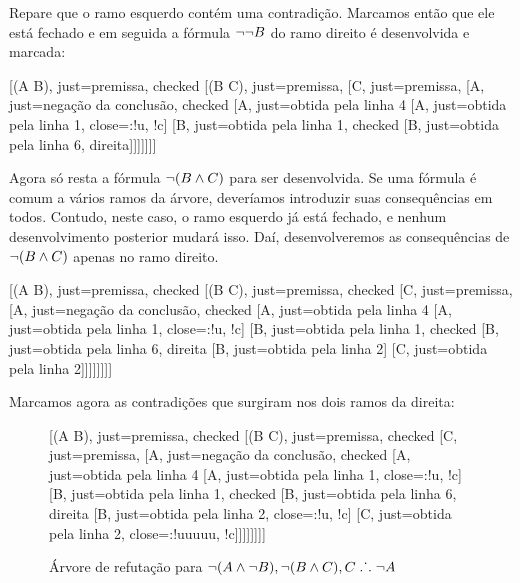 Repare que o ramo esquerdo contém uma contradição. Marcamos então que ele está fechado e em seguida a fórmula $\neg \neg B$ do ramo direito é desenvolvida e marcada:
\begin{center}
	\begin{tableau}
		{
		}
		[\enot(A \eand \enot B), just=premissa, checked
		[\enot(B \eand C), just=premissa, 
		[C, just=premissa, 
		[\enot \enot A, just={negação da conclusão}, checked
		[A, just={obtida pela linha 4}
			[\enot A, just={obtida pela linha 1}, close={:!u, !c}]
			[\enot \enot B, just={obtida pela linha 1}, checked
			[B, just={obtida pela linha 6, direita}]]]]]]]
	\end{tableau}
\end{center}

Agora só resta a fórmula $\neg(B \wedge C)$ para ser desenvolvida. 
Se uma fórmula é comum a vários ramos da árvore, deveríamos introduzir suas consequências em todos. Contudo, neste caso, o ramo esquerdo já está fechado, e nenhum desenvolvimento posterior mudará isso.
Daí, desenvolveremos as consequências de $\neg(B \wedge C)$ apenas no ramo direito.

\begin{center}
	\begin{tableau}
		{
		}
		[\enot(A \eand \enot B), just=premissa, checked
		[\enot(B \eand C), just=premissa, checked
		[C, just=premissa, 
		[\enot \enot A, just={negação da conclusão}, checked
		[A, just={obtida pela linha 4}
			[\enot A, just={obtida pela linha 1}, close={:!u, !c}]
			[\enot \enot B, just={obtida pela linha 1}, checked
			[B, just={obtida pela linha 6, direita}			
				[\enot B, just={obtida pela linha 2}]
				[\enot C, just={obtida pela linha 2}]]]]]]]]
	\end{tableau}
\end{center}

Marcamos agora as contradições que surgiram nos dois ramos da direita:

\begin{figure}[h!]
\begin{center}
	\begin{tableau}
		{
		}
		[\enot(A \eand \enot B), just=premissa, checked
		[\enot(B \eand C), just=premissa, checked
		[C, just=premissa, 
		[\enot \enot A, just={negação da conclusão}, checked
		[A, just={obtida pela linha 4}
			[\enot A, just={obtida pela linha 1}, close={:!u, !c}]
			[\enot \enot B, just={obtida pela linha 1}, checked
			[B, just={obtida pela linha 6, direita}			
				[\enot B, just={obtida pela linha 2}, close={:!u, !c}]
				[\enot C, just={obtida pela linha 2}, close={:!uuuuu, !c}]]]]]]]]
	\end{tableau}
\end{center}
	\caption{Árvore de refutação para  $\neg(A \wedge \neg B), \neg(B \wedge C), C \mathrel{\ldotp\dot{}\,\ldotp} \neg A$}
	\label{truth.trees.ex.2}
\end{figure}

